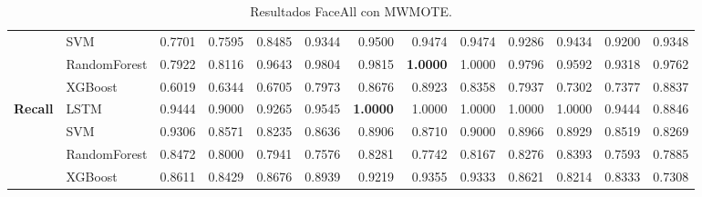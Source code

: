 \begin{table}[h]
\begin{adjustbox}{max width=15cm}
\begin{tabular}{|c|l|r|r|r|r|r|r|r|r|r|r|r|}
	& SVM &  0.7701 &  0.7595 &  0.8485 &  0.9344 &  0.9500 &  0.9474 &  0.9474 &  0.9286 &  0.9434 &  0.9200 &  0.9348 \\
	& RandomForest &  0.7922 &  0.8116 &  0.9643 &  0.9804 &  0.9815 &  \textbf{1.0000} &  1.0000 &  0.9796 &  0.9592 &  0.9318 &  0.9762 \\
	& XGBoost &  0.6019 &  0.6344 &  0.6705 &  0.7973 &  0.8676 &  0.8923 &  0.8358 &  0.7937 &  0.7302 &  0.7377 &  0.8837 \\
	\hline
	\textbf{Recall} & LSTM &  0.9444 &  0.9000 &  0.9265 &  0.9545 &  \textbf{1.0000} &  1.0000 &  1.0000 &  1.0000 &  1.0000 &  0.9444 &  0.8846 \\
	& SVM &  0.9306 &  0.8571 &  0.8235 &  0.8636 &  0.8906 &  0.8710 &  0.9000 &  0.8966 &  0.8929 &  0.8519 &  0.8269 \\
	& RandomForest &  0.8472 &  0.8000 &  0.7941 &  0.7576 &  0.8281 &  0.7742 &  0.8167 &  0.8276 &  0.8393 &  0.7593 &  0.7885 \\
	& XGBoost &  0.8611 &  0.8429 &  0.8676 &  0.8939 &  0.9219 &  0.9355 &  0.9333 &  0.8621 &  0.8214 &  0.8333 &  0.7308 \\
	\hline
\end{tabular}
\end{adjustbox}
\caption{Resultados FaceAll con MWMOTE.}
\label{tab:faceAllMWMOTE}
\end{table}

